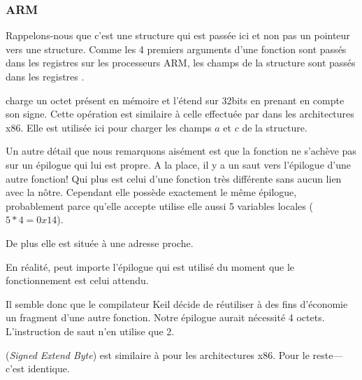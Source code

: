 ﻿\subsubsection{ARM}

\myparagraph{\OptimizingKeilVI (\ThumbMode)}



Rappelons-nous que c'est une structure qui est passée ici et non pas un pointeur vers une structure. Comme 
les 4 premiers arguments d'une fonction sont passés dans les registres sur les processeurs ARM, les champs 
de la structure sont passés dans les registres .

 charge un octet présent en mémoire et l'étend sur 32bits en prenant en compte son signe. Cette 
opération est similaire à celle effectuée par \MOVSX dans les architectures x86. Elle est utilisée ici pour 
charger les champs $a$ et $c$ de la structure.


Un autre détail que nous remarquons aisément est que la fonction ne s'achève pas sur un épilogue qui lui est 
propre. A la place, il y a un saut vers l'épilogue d'une autre fonction! Qui plus est celui d'une fonction 
très différente sans aucun lien avec la nôtre. Cependant elle possède exactement le même épilogue, 
probablement parce qu'elle accepte utilise elle aussi 5 variables locales ($5*4=0x14$).

De plus elle est située à une adresse proche.

En réalité, peut importe l'épilogue qui est utilisé du moment que le fonctionnement est celui attendu.

Il semble donc que le compilateur Keil décide de réutiliser à des fins d'économie un fragment d'une autre 
fonction. Notre épilogue aurait nécessité 4 octets. L'instruction de saut n'en utilise que 2.




 (\emph{Signed Extend Byte}) est similaire à \MOVSX pour les architectures x86.
Pour le reste---c'est identique.
